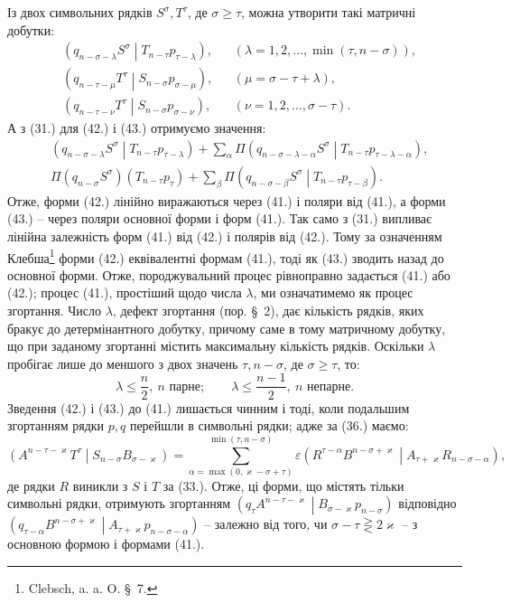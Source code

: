 \documentclass[11pt]{article}
\newcommand{\pair}[2]{\left(#1\middle|#2\right)}
\newcommand{\eps}{\varepsilon}
\begin{document}
Із двох символьних рядків $S^\sigma,T^\tau$, де $\sigma\ge\tau$, можна утворити такі матричні добутки:
\begin{align}
&\pair{q_{n-\sigma-\lambda}S^\sigma}{T_{n-\tau}p_{\tau-\lambda}},
&&(\lambda=1,2,\ldots,\min(\tau,n-\sigma)),\tag{41}\\
&\pair{q_{n-\tau-\mu}T^\tau}{S_{n-\sigma}p_{\sigma-\mu}},
&&(\mu=\sigma-\tau+\lambda),\tag{42}\\
&\pair{q_{n-\tau-\nu}T^\tau}{S_{n-\sigma}p_{\sigma-\nu}},
&&(\nu=1,2,\ldots,\sigma-\tau).
\tag{43}
\end{align}
А з (31.) для (42.) і (43.) отримуємо значення:
\begin{align}
&\pair{q_{n-\sigma-\lambda}S^\sigma}{T_{n-\tau}p_{\tau-\lambda}}
 +\sum_{\alpha}\Pi
 \pair{q_{n-\sigma-\lambda-\alpha}S^\sigma}
 {T_{n-\tau}p_{\tau-\lambda-\alpha}},\tag{42a}\\
&\Pi(q_{n-\sigma}S^\sigma)(T_{n-\tau}p_\tau)
 +\sum_{\beta}\Pi
 \pair{q_{n-\sigma-\beta}S^\sigma}{T_{n-\tau}p_{\tau-\beta}}.
\tag{43a}
\end{align}
Отже, форми (42.) лінійно виражаються через (41.) і поляри від (41.), а форми (43.) -- через поляри основної форми і форм (41.). Так само з (31.) випливає лінійна залежність форм (41.) від (42.) і полярів від (42.). Тому за означенням Клебша\footnote{Clebsch, a. a. O. \S\ 7.} форми (42.) еквівалентні формам (41.), тоді як (43.) зводить назад до основної форми. Отже, породжувальний процес рівноправно задається (41.) або (42.); процес (41.), простіший щодо числа $\lambda$, ми означатимемо як процес згортання. Число $\lambda$, дефект згортання (пор. \S\ 2), дає кількість рядків, яких бракує до детермінантного добутку, причому саме в тому матричному добутку, що при заданому згортанні містить максимальну кількість рядків. Оскільки $\lambda$ пробігає лише до меншого з двох значень $\tau,n-\sigma$, де $\sigma\ge\tau$, то:
\begin{equation}
 \lambda\le\frac n2,\ n\text{ парне};\qquad
 \lambda\le\frac{n-1}{2},\ n\text{ непарне}.
\tag{44}
\end{equation}
Зведення (42.) і (43.) до (41.) лишається чинним і тоді, коли подальшим згортанням рядки $p,q$ перейшли в символьні рядки; адже за (36.) маємо:
\[
 \pair{A^{n-\tau-\varkappa}T^\tau}{S_{n-\sigma}B_{\sigma-\varkappa}}
 =\sum_{\alpha=\max(0,\varkappa-\sigma+\tau)}^{\min(\tau,n-\sigma)}
 \eps\pair{R^{\tau-\alpha}B^{n-\sigma+\varkappa}}
 {A_{\tau+\varkappa}R_{n-\sigma-\alpha}},
\]
де рядки $R$ виникли з $S$ і $T$ за (33.). Отже, ці форми, що містять тільки символьні рядки, отримують згортанням $\pair{q_\tau A^{n-\tau-\varkappa}}{B_{\sigma-\varkappa}p_{n-\sigma}}$ відповідно $\pair{q_{\tau-\alpha}B^{n-\sigma+\varkappa}}{A_{\tau+\varkappa}p_{n-\sigma-\alpha}}$ -- залежно від того, чи $\sigma-\tau\gtreqless 2\varkappa$ -- з основною формою і формами (41.).
\end{document}
